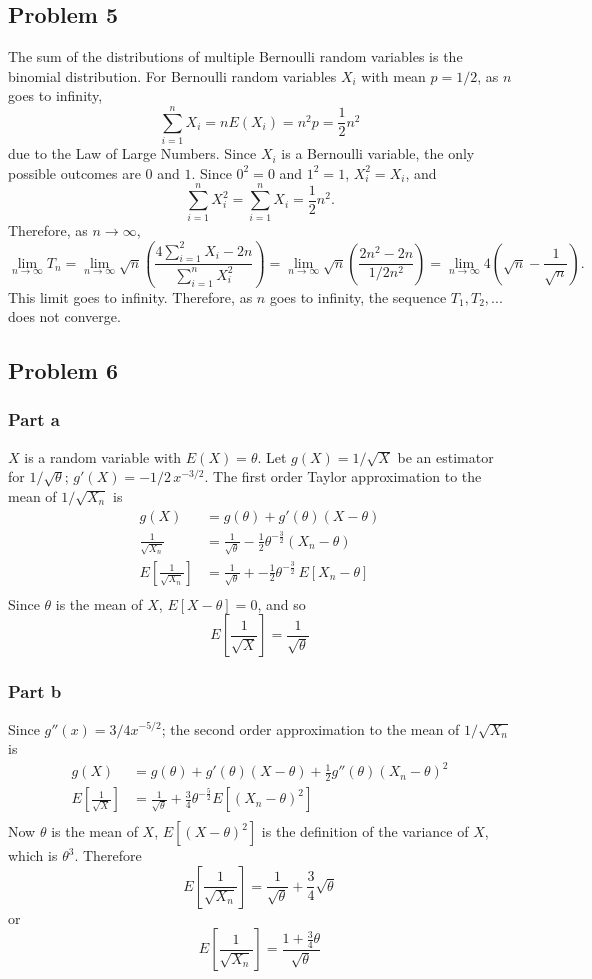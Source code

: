 \documentclass{article}
\begin{document}
\subsection*{Problem 5}
The sum of the distributions of multiple Bernoulli random variables is the binomial distribution. For Bernoulli random variables $X_i$ with mean $p = 1/2$, as $n$ goes to infinity, \[\sum_{i=1}^n X_i = nE(X_i) = n^2p = \frac{1}{2}n^2\] due to the Law of Large Numbers. Since $X_i$ is a Bernoulli variable, the only possible outcomes are $0$ and $1$. Since $0^2=0$ and $1^2=1$, $X_i^2 = X_i$, and \[\sum_{i=1}^n X_i^2 = \sum_{i=1}^n X_i = \frac{1}{2}n^2.\] Therefore, as $n\to\infty$, \[\lim_{n\to\infty}T_n = \lim_{n\to\infty}\sqrt{n}\left(\frac{4\sum_{i=1}^2 X_i - 2n}{\sum_{i=1}^n X_i^2}\right) =\lim_{n\to\infty} \sqrt{n}\left(\frac{2n^2-2n}{1/2n^2}\right) = \lim_{n\to\infty}4\left(\sqrt{n} - \frac{1}{\sqrt{n}}\right).\]
This limit goes to infinity. Therefore, as $n$ goes to infinity, the sequence  $T_1, T_2, ...$ does not converge. 

\subsection*{Problem 6}
\subsubsection*{Part a}
$X$ is a random variable with $E(X) = \theta$. Let $g(X) = 1/\sqrt{X}$ be an estimator for $1/\sqrt{\theta}$; $g'(X) = -1/2\,x^{-3/2}.$ The first order Taylor approximation to the mean of $1/\sqrt{X_n}$ is
\[\begin{aligned}
g(X) &= g(\theta)+g'(\theta)(X-\theta) \\
\frac{1}{\sqrt{X_n}} &= \frac{1}{\sqrt{\theta}} -\frac{1}{2}\theta^{-\frac{3}{2}}(X_n - \theta) \\
E\left[\frac{1}{\sqrt{X_n}}\right] &= \frac{1}{\sqrt{\theta}} + -\frac{1}{2}\theta^{-\frac{3}{2}}\,E\left[X_n - \theta\right] \\
\end{aligned}\]
Since $\theta$ is the mean of $X$, $E[X-\theta] = 0$, and so 
\[E\left[\frac{1}{\sqrt{X}}\right] = \frac{1}{\sqrt{\theta}}\]
\subsubsection*{Part b}
Since $g''(x) = 3/4x^{-5/2}$; the second order approximation to the mean of $1/\sqrt{X_n}$ is 
\[\begin{aligned}
g(X) &= g(\theta)+g'(\theta)(X-\theta)+\frac{1}{2}g''(\theta)(X_n-\theta)^2 \\
E\left[\frac{1}{\sqrt{X}}\right] &= \frac{1}{\sqrt{\theta}} + \frac{3}{4}\theta^{-\frac{5}{2}}E\left[(X_n - \theta)^2\right] \\
\end{aligned}\]
Now $\theta$ is the mean of $X$, $E\left[(X - \theta)^2\right]$ is the definition of the variance of $X$, which is $\theta^3$. Therefore
\[E\left[\frac{1}{\sqrt{X_n}}\right] = \frac{1}{\sqrt{\theta}} + \frac{3}{4}\sqrt{\theta}\] or 
\[E\left[\frac{1}{\sqrt{X_n}}\right] = \frac{1+\frac{3}{4}\theta}{\sqrt{\theta}}\]
\end{document}
